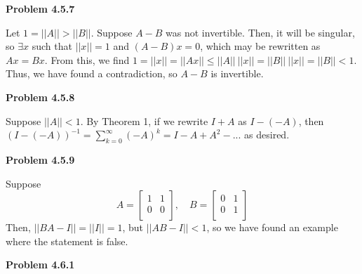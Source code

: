 \documentclass{article}
\newcommand{\Problem}[1]{\textbf{Problem #1}}
\begin{document}
	
\Problem{4.5.7}

Let $1 = ||A|| > ||B||$. Suppose $A - B$ was not invertible. Then, it will be singular, so $\exists x$ such that $||x|| = 1$ and $(A-B)x = 0$, which may be rewritten as $Ax = Bx$. From this, we find $1 = ||x|| = ||Ax|| \leq ||A||\ ||x|| = ||B||\ ||x|| = ||B|| < 1$. Thus, we have found a contradiction, so $A - B$ is invertible. 

\Problem{4.5.8}

Suppose $||A|| < 1$. By Theorem 1, if we rewrite $I + A$ as $I - (-A)$, then $(I - (-A))^{-1} = \displaystyle\sum_{k = 0}^{\infty} (-A)^k = I - A + A^2 - ...$ as desired. 

\Problem{4.5.9}

Suppose 
\begin{equation*}
A = 
\begin{bmatrix}
1 & 1\\
0 & 0\\	
\end{bmatrix},\quad
B = 
\begin{bmatrix}
0 & 1\\
0 & 1\\	
\end{bmatrix}
\end{equation*}
Then, $||BA - I|| = ||I|| = 1$, but $||AB - I|| < 1$, so we have found an example where the statement is false. 

\Problem{4.6.1}
\end{document}
